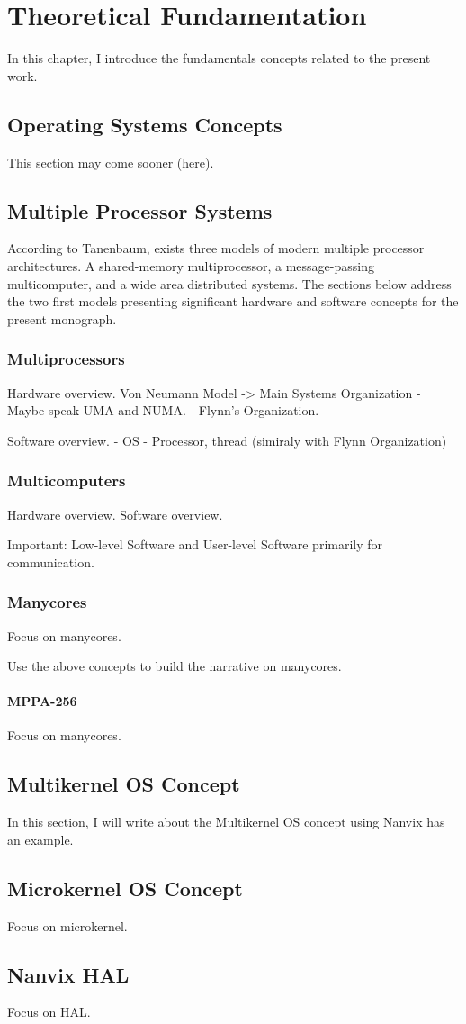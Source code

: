\chapter{Theoretical Fundamentation} %
\label{ch.fundamentation}

    In this chapter, I introduce the fundamentals concepts related to the present work.

\section{Operating Systems Concepts}
    This section may come sooner (here).

\section{Multiple Processor Systems}

    According to Tanenbaum, exists three models of modern multiple processor architectures.
    A shared-memory multiprocessor, a message-passing multicomputer, and a wide area distributed systems.
    The sections below address the two first models presenting significant hardware and software concepts for the present monograph.

    \subsection{Multiprocessors}
    Hardware overview.
    Von Neumann Model -> Main Systems Organization
    - Maybe speak UMA and NUMA.
    - Flynn's Organization.
        
    Software overview.
    - OS
    - Processor, thread (simiraly with Flynn Organization)


\subsection{Multicomputers}
    Hardware overview.
    Software overview.

    Important: Low-level Software and User-level Software primarily for communication.

\subsection{Manycores}
    Focus on manycores.

    Use the above concepts to build the narrative on manycores.

\subsubsection{MPPA-256}
    Focus on manycores.

\section{Multikernel OS Concept}
    In this section, I will write about the Multikernel OS concept using Nanvix has an example.

\section{Microkernel OS Concept}
    Focus on microkernel.

\section{Nanvix HAL}
    Focus on HAL.